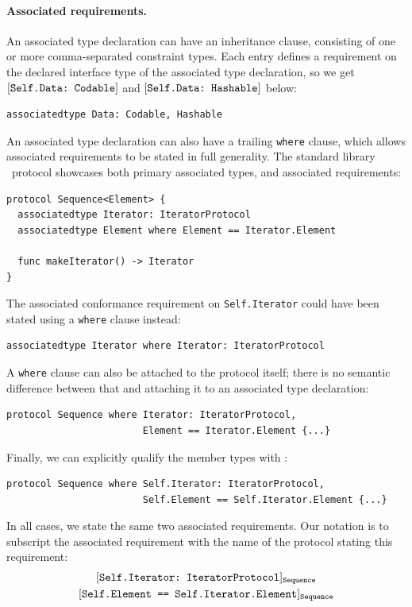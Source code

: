 \documentclass[../generics]{subfiles}
\begin{document}
\paragraph{Associated requirements.}
An associated type declaration can have an inheritance clause, consisting of one or more comma-separated constraint types. Each entry defines a requirement on the declared interface type of the associated type declaration, so we get $[\texttt{Self.Data:~Codable}]$ and $[\texttt{Self.Data:~Hashable}]$ below:
\begin{Verbatim}
associatedtype Data: Codable, Hashable
\end{Verbatim}

An associated type declaration can also have a trailing \texttt{where} clause, which allows associated requirements to be stated in full generality. The standard library \tSequence\ protocol showcases both primary associated types, and associated requirements:
\begin{Verbatim}
protocol Sequence<Element> {
  associatedtype Iterator: IteratorProtocol
  associatedtype Element where Element == Iterator.Element

  func makeIterator() -> Iterator
}
\end{Verbatim}
The associated conformance requirement on \texttt{Self.Iterator} could have been stated using a \texttt{where} clause instead:
\begin{Verbatim}
associatedtype Iterator where Iterator: IteratorProtocol
\end{Verbatim}
A \texttt{where} clause can also be attached to the protocol itself; there is no semantic difference between that and attaching it to an associated type declaration:
\begin{Verbatim}
protocol Sequence where Iterator: IteratorProtocol,
                        Element == Iterator.Element {...}
\end{Verbatim}
Finally, we can explicitly qualify the member types with \tSelf:
\begin{Verbatim}
protocol Sequence where Self.Iterator: IteratorProtocol,
                        Self.Element == Self.Iterator.Element {...}
\end{Verbatim}
In all cases, we state the same two associated requirements. Our notation is to subscript the associated requirement with the name of the protocol stating this requirement:
\begin{gather*}
\ConfReq{Self.Iterator}{IteratorProtocol}_\texttt{Sequence}\\
\SameReq{Self.Element}{Self.Iterator.Element}_\texttt{Sequence}
\end{gather*}
\end{document}
